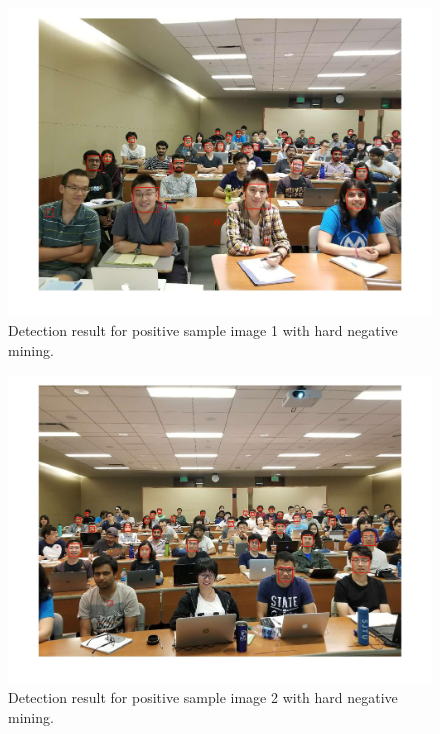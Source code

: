 \documentclass[10pt]{article}
\begin{document}
	\newpage\begin{figure}[ht]
		\includegraphics[width=\textwidth]{detection_face_1_hard_neg.jpg}
		\centering
		\caption{Detection result for positive sample image 1 with hard negative mining.}
		\label{14}
	\end{figure}
	\newpage\begin{figure}[ht]
		\includegraphics[width=\textwidth]{detection_face_2_hard_neg.jpg}
		\centering
		\caption{Detection result for positive sample image 2 with hard negative mining.}
		\label{15}
	\end{figure}
\end{document}
